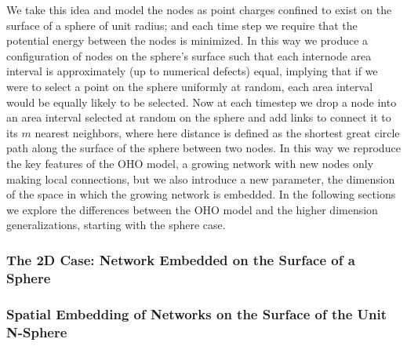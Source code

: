 \documentclass[aps,pre,reprint,superscriptaddress,amsmath,amssymb]{revtex4-1}
\begin{document}
We take this idea and model the nodes as point charges confined to exist on the surface of a sphere of unit radius; and each time step we require that the potential energy between the nodes is minimized.
In this way we produce a configuration of nodes on the sphere's surface such that each internode area interval is approximately (up to numerical defects) equal, implying that if we were to select a point on the sphere uniformly at random, each area interval would be equally likely to be selected.
Now at each timestep we drop a node into an area interval selected at random on the sphere and add links to connect it to its $m$ nearest neighbors, where here distance is defined as the shortest great circle path along the surface of the sphere between two nodes.
In this way we reproduce the key features of the OHO model, a growing network with new nodes only making local connections, but we also introduce a new parameter, the dimension of the space in which the growing network is embedded.
In the following sections we explore the differences between the OHO model and the higher dimension generalizations, starting with the sphere case. 

\subsubsection{The 2D Case: Network Embedded on the Surface of a Sphere}


\subsubsection{Spatial Embedding of Networks on the Surface of the Unit N-Sphere}
\end{document}
